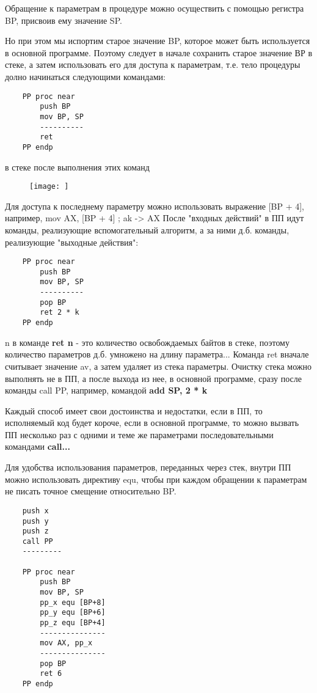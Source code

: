 Обращение к параметрам в процедуре можно осуществить с помощью регистра BP, присвоив ему значение SP.

Но при этом мы испортим старое значение BP, которое может быть используется в основной программе. Поэтому следует в начале сохранить старое значение ВР в стеке, а затем использовать его
для доступа к параметрам, т.е. тело процедуры долно начинаться следующими командами:
\begin{verbatim}
    PP proc near
        push BP
        mov BP, SP
        ----------
        ret
    PP endp
\end{verbatim}

в стеке после выполнения этих команд
\begin{figure}
    \texttt{[image: ]}
\end{figure}

Для доступа к последнему параметру можно использовать выражение [BP + 4], например, mov AX, [BP + 4] ; ak -> AX
После "входных действий" в ПП идут команды, реализующие вспомогательный алгоритм, а за ними д.б. команды, реализующие "выходные действия":

\begin{verbatim}
    PP proc near
        push BP
        mov BP, SP
        ----------
        pop BP
        ret 2 * k
    PP endp
\end{verbatim}

n в команде \textbf{ret n} - это количество освобождаемых байтов в стеке, поэтому количество параметров д.б. умножено на длину параметра...
Команда ret вначале считывает значение av, а затем удаляет из стека параметры. Очистку стека можно выполнять не в ПП, а после выхода из нее, в основной программе, сразу после команды call PP, например, командой \textbf{add SP, 2 * k}

Каждый способ имеет свои достоинства и недостатки, если в ПП, то исполняемый код будет короче, если в основной программе, то можно вызвать ПП несколько раз с одними и теме же параметрами последовательными командами \textbf{call...}

Для удобства использования параметров, переданных через стек, внутри ПП можно использовать директиву equ, чтобы при каждом обращении к параметрам не писать точное смещение относительно BP.

\begin{verbatim}
    push x
    push y
    push z
    call PP
    ---------

    PP proc near
        push BP
        mov BP, SP
        pp_x equ [BP+8]
        pp_y equ [BP+6]
        pp_z equ [BP+4]
        ---------------
        mov AX, pp_x
        ---------------
        pop BP
        ret 6
    PP endp
\end{verbatim}


